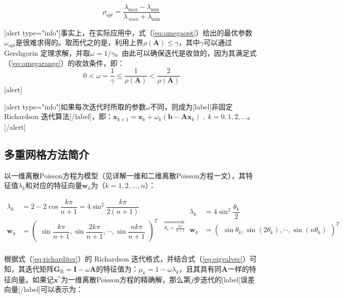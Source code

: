 \documentclass[12pt, UTF8, nofonts]{ctexart}
\begin{document}
\begin{equation}
  \label{eq:rhoopt}
  \rho_{opt} = \dfrac{\lambda_{\max}-\lambda_{\min}}{\lambda_{\ max}+\lambda_{\min}}
\end{equation}

[alert type="info"]事实上，在实际应用中，式（\ref{eq:omegaopt}）给出的最优参数$\omega_{opt}$是很难求得的。取而代之的是，利用上界$\rho(\boldsymbol{A})\leq\gamma$，其中$\gamma$可以通过 Gershgorin 定理求解，并取$\omega=1/\gamma$。由此可以确保迭代是收敛的，因为其满足式（\ref{eq:omegarange}）的收敛条件，即：\[0<\omega=\dfrac{1}{\gamma}\leq\dfrac{1}{\rho(\boldsymbol{A})}<\dfrac{2}{\rho(\boldsymbol{A})}\][alert]

[alert type="info"]如果每次迭代时所取的参数$\omega$不同，则成为[label]非固定 Richardson 迭代算法[/label]，即：$\boldsymbol{x}_{k+1}=\boldsymbol{x}_k+\omega_k(\boldsymbol{b}-\boldsymbol{Ax}_k)\;,\;k=0,1,2,\ldots$。[/alert]

\subsection*{多重网格方法简介}

以一维离散Poisson方程为模型（见详解一维和二维离散Poisson方程一文），其特征值$\lambda_k$和对应的特征向量$\boldsymbol{w}_k$为（$k=1,2,\ldots,n$）：

\begin{equation}
  \label{eq:eigvalvec}
  \begin{aligned}
    \lambda_k & = 2 - 2\cos\dfrac{k\pi}{n+1} = 4\sin^2\dfrac{k\pi}{2(n+1)} \\
    \boldsymbol{w}_k & =
      \begin{pmatrix}
        \sin\dfrac{k\pi}{n+1}, \sin\dfrac{2k\pi}{n+1}, \cdots, \sin\dfrac{nk\pi}{n+1}
      \end{pmatrix}^T \\
  \end{aligned}
  \;\underset{\theta_k=\frac{k\pi}{n+1}}{\Longrightarrow}
  \begin{aligned}
    \lambda_k & = 4\sin^2\dfrac{\theta_k}{2} \\
    \boldsymbol{w}_k & =
      \begin{pmatrix}
        \sin\theta_k, \sin(2\theta_k), \cdots, \sin(n\theta_k)
      \end{pmatrix}^T \\
  \end{aligned}
\end{equation}

根据式（\ref{eq:richarditer}）的 Richardson 迭代格式，并结合式（\ref{eq:eigvalvec}）可知，其迭代矩阵$\boldsymbol{G}_{\mathrm{R}}=\boldsymbol{I}-\omega\boldsymbol{A}$的特征值为：$\mu_k=1-\omega\lambda_k$，且其具有同$\boldsymbol{A}$一样的特征向量。如果记$\boldsymbol{x}^{\ast}$为一维离散Poisson方程的精确解，那么第$j$步迭代的[label]误差向量[/label]可以表示为：
\end{document}
